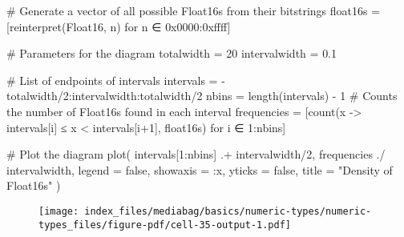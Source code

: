\documentclass[
  letterpaper,
  DIV=11,
  numbers=noendperiod]{scrreprt}
\newenvironment{Shaded}{\begin{snugshade}}{\end{snugshade}}
\newcommand{\BaseNTok}[1]{\textcolor[rgb]{0.68,0.00,0.00}{#1}}
\newcommand{\CommentTok}[1]{\textcolor[rgb]{0.37,0.37,0.37}{#1}}
\newcommand{\ConstantTok}[1]{\textcolor[rgb]{0.56,0.35,0.01}{#1}}
\newcommand{\DataTypeTok}[1]{\textcolor[rgb]{0.68,0.00,0.00}{#1}}
\newcommand{\FloatTok}[1]{\textcolor[rgb]{0.68,0.00,0.00}{#1}}
\newcommand{\FunctionTok}[1]{\textcolor[rgb]{0.28,0.35,0.67}{#1}}
\newcommand{\NormalTok}[1]{\textcolor[rgb]{0.00,0.23,0.31}{#1}}
\newcommand{\OperatorTok}[1]{\textcolor[rgb]{0.37,0.37,0.37}{#1}}
\newcommand{\StringTok}[1]{\textcolor[rgb]{0.13,0.47,0.30}{#1}}
\begin{document}
\begin{Shaded}
\begin{Highlighting}[]
\CommentTok{\# Generate a vector of all possible Float16s from their bitstrings}
\NormalTok{float16s }\OperatorTok{=}\NormalTok{ [}\FunctionTok{reinterpret}\NormalTok{(}\DataTypeTok{Float16}\NormalTok{, n) for n }\OperatorTok{∈} \BaseNTok{0x0000}\OperatorTok{:}\BaseNTok{0xffff}\NormalTok{]}

\CommentTok{\# Parameters for the diagram}
\NormalTok{totalwidth }\OperatorTok{=} \FloatTok{20}
\NormalTok{intervalwidth }\OperatorTok{=} \FloatTok{0.1}

\CommentTok{\# List of endpoints of intervals}
\NormalTok{intervals }\OperatorTok{=} \OperatorTok{{-}}\NormalTok{totalwidth}\OperatorTok{/}\FloatTok{2}\OperatorTok{:}\NormalTok{intervalwidth}\OperatorTok{:}\NormalTok{totalwidth}\OperatorTok{/}\FloatTok{2}
\NormalTok{nbins }\OperatorTok{=} \FunctionTok{length}\NormalTok{(intervals) }\OperatorTok{{-}} \FloatTok{1}
\CommentTok{\# Counts the number of Float16s found in each interval}
\NormalTok{frequencies }\OperatorTok{=}\NormalTok{ [}\FunctionTok{count}\NormalTok{(x }\OperatorTok{{-}\textgreater{}}\NormalTok{ intervals[i] }\OperatorTok{≤}\NormalTok{ x }\OperatorTok{\textless{}}\NormalTok{ intervals[i}\OperatorTok{+}\FloatTok{1}\NormalTok{], float16s) for i }\OperatorTok{∈} \FloatTok{1}\OperatorTok{:}\NormalTok{nbins]}

\CommentTok{\# Plot the diagram}
\FunctionTok{plot}\NormalTok{(}
\NormalTok{    intervals[}\FloatTok{1}\OperatorTok{:}\NormalTok{nbins] }\OperatorTok{.+}\NormalTok{ intervalwidth}\OperatorTok{/}\FloatTok{2}\NormalTok{,}
\NormalTok{    frequencies }\OperatorTok{./}\NormalTok{ intervalwidth,}
\NormalTok{    legend }\OperatorTok{=} \ConstantTok{false}\NormalTok{,}
\NormalTok{    showaxis }\OperatorTok{=} \OperatorTok{:}\NormalTok{x,}
\NormalTok{    yticks }\OperatorTok{=} \ConstantTok{false}\NormalTok{,}
\NormalTok{    title }\OperatorTok{=} \StringTok{"Density of Float16s"}
\NormalTok{)}
\end{Highlighting}
\end{Shaded}

\begin{figure}[H]

{\centering \texttt{[image: index\_files/mediabag/basics/numeric-types/numeric-types\_files/figure-pdf/cell-35-output-1.pdf]}

}

\end{figure}
\end{document}
